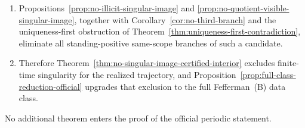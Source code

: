 \begin{proposition}
\begin{enumerate}[label=(\roman*), leftmargin=2.2em]
\item Propositions~\ref{prop:no-illicit-singular-image} and \ref{prop:no-quotient-visible-singular-image}, together with Corollary~\ref{cor:no-third-branch} and the uniqueness-first obstruction of Theorem~\ref{thm:uniqueness-first-contradiction}, eliminate all standing-positive same-scope branches of such a candidate.
\item Therefore Theorem~\ref{thm:no-singular-image-certified-interior} excludes finite-time singularity for the realized trajectory, and Proposition~\ref{prop:full-class-reduction-official} upgrades that exclusion to the full Fefferman~(B) data class.
\end{enumerate}
No additional theorem enters the proof of the official periodic statement.
\end{proposition}

